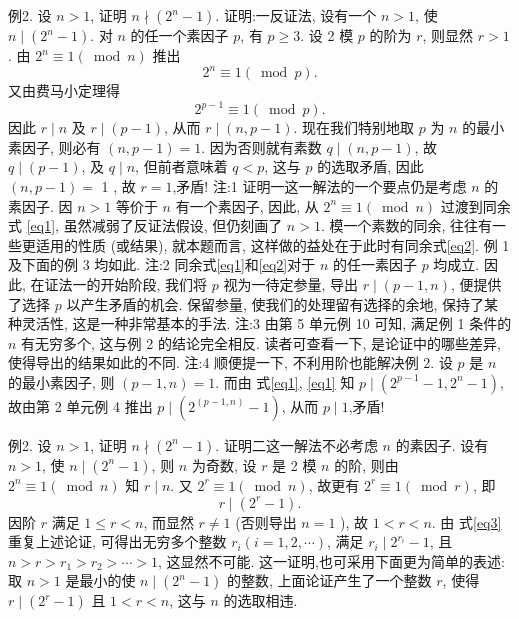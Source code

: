 例2. 设 $n>1$, 证明 $n \nmid\left(2^n-1\right)$.
证明:一反证法, 设有一个 $n>1$, 使 $n \mid\left(2^n-1\right)$. 对 $n$ 的任一个素因子 $p$, 有 $p \geqslant 3$. 设 2 模 $p$ 的阶为 $r$, 则显然 $r>1$. 由 $2^n \equiv 1(\bmod n)$ 推出
$$
2^n \equiv 1(\bmod p) . \label{eq1}
$$
又由费马小定理得
$$
2^{p-1} \equiv 1(\bmod p) . \label{eq2}
$$
因此 $r \mid n$ 及 $r \mid(p-1)$, 从而 $r \mid(n, p-1)$. 现在我们特别地取 $p$ 为 $n$ 的最小素因子, 则必有 $(n, p-1)=1$. 因为否则就有素数 $q \mid(n, p-1)$, 故 $q \mid (p-1)$, 及 $q \mid n$, 但前者意味着 $q<p$, 这与 $p$ 的选取矛盾, 因此 $(n, p-1)=$ 1 , 故 $r=1$,矛盾!
注:1 证明一这一解法的一个要点仍是考虑 $n$ 的素因子.
因 $n>1$ 等价于 $n$ 有一个素因子, 因此, 从 $2^n \equiv 1(\bmod n)$ 过渡到同余式 \ref{eq1}, 虽然减弱了反证法假设, 但仍刻画了 $n>1$.
模一个素数的同余, 往往有一些更适用的性质 (或结果), 就本题而言, 这样做的益处在于此时有同余式\ref{eq2}. 例 1 及下面的例 3 均如此.
注:2 同余式\ref{eq1}和\ref{eq2}对于 $n$ 的任一素因子 $p$ 均成立.
因此, 在证法一的开始阶段, 我们将 $p$ 视为一待定参量, 导出 $r \mid(p-1, n)$, 便提供了选择 $p$ 以产生矛盾的机会.
保留参量, 使我们的处理留有选择的余地, 保持了某种灵活性, 这是一种非常基本的手法.
注:3 由第 5 单元例 10 可知, 满足例 1 条件的 $n$ 有无穷多个, 这与例 2 的结论完全相反.
读者可查看一下, 是论证中的哪些差异, 使得导出的结果如此的不同.
注:4 顺便提一下, 不利用阶也能解决例 2. 设 $p$ 是 $n$ 的最小素因子, 则 $(p-1, n)=1$. 而由 式\ref{eq1}, \ref{eq1} 知 $p \mid\left(2^{p-1}-1,2^n-1\right)$, 故由第 2 单元例 4 推出
$p \mid\left(2^{(p-1, n)}-1\right)$, 从而 $p \mid 1$,矛盾!



例2. 设 $n>1$, 证明 $n \nmid\left(2^n-1\right)$.
证明二这一解法不必考虑 $n$ 的素因子.
设有 $n>1$, 使 $n \mid\left(2^n-1\right)$, 则 $n$ 为奇数, 设 $r$ 是 2 模 $n$ 的阶, 则由 $2^n \equiv 1(\bmod n)$ 知 $r \mid n$. 又 $2^r \equiv 1(\bmod n)$, 故更有 $2^r \equiv 1(\bmod r)$, 即
$$
r \mid\left(2^r-1\right) . \label{eq3}
$$
因阶 $r$ 满足 $1 \leqslant r<n$, 而显然 $r \neq 1$ (否则导出 $n=1$ ), 故 $1<r<n$. 由 式\ref{eq3} 重复上述论证, 可得出无穷多个整数 $r_i(i=1,2, \cdots)$, 满足 $r_i \mid 2^{r_i}-1$, 且 $n>r>r_1>r_2>\cdots>1$, 这显然不可能.
这一证明,也可采用下面更为简单的表述: 取 $n>1$ 是最小的使 $n \mid\left(2^n-1\right)$ 的整数, 上面论证产生了一个整数 $r$, 使得 $r \mid\left(2^r-1\right)$ 且 $1<r<n$, 这与 $n$ 的选取相违.




